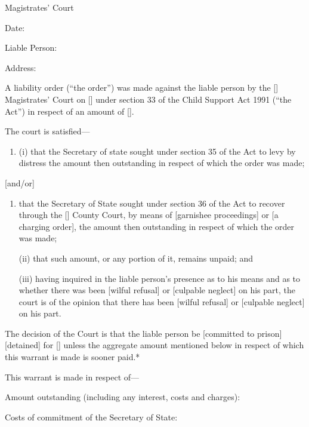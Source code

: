 \documentclass[12pt,a4paper]{article}
\begin{document}
\medskip

{\raggedleft \hspace{0.5\linewidth}\dotfill Magistrates' Court

}

\medskip

Date:

\medskip

Liable Person:

\medskip

Address:

\medskip

A liability order (``the order'') was made against the liable person by the [\phantom{Bolton}] Magistrates' Court on [\phantom{\today}] under section 33 of the Child Support Act 1991 (``the Act'') in respect of an amount of [\phantom{£100.00}].

The court is satisfied---
\begin{enumerate}
\item[]
(i) that the Secretary of state sought under section 35 of the Act to levy by distress the amount then outstanding in respect of which the order was made;
\end{enumerate}
[and/or]
\begin{enumerate}\item[]
that the Secretary of State sought under section 36 of the Act to recover through the [\phantom{Bolton}] County Court, by means of [garnishee proceedings] or [a charging order], the amount then outstanding in respect of which the order was made;

(ii) that such amount, or any portion of it, remains unpaid; and

(iii) having inquired in the liable person's presence as to his means and as to whether there was been [wilful refusal] or [culpable neglect] on his part, the court is of the opinion that there has been [wilful refusal] or [culpable neglect] on his part.
\end{enumerate}

The decision of the Court is that the liable person be [committed to prison] [detained] for [\phantom{7 days}] unless the aggregate amount mentioned below in respect of which this warrant is made is sooner paid.*

\medskip

This warrant is made in respect of---

Amount outstanding (including any interest, costs and charges):

Costs of commitment of the Secretary of State:
\end{document}
